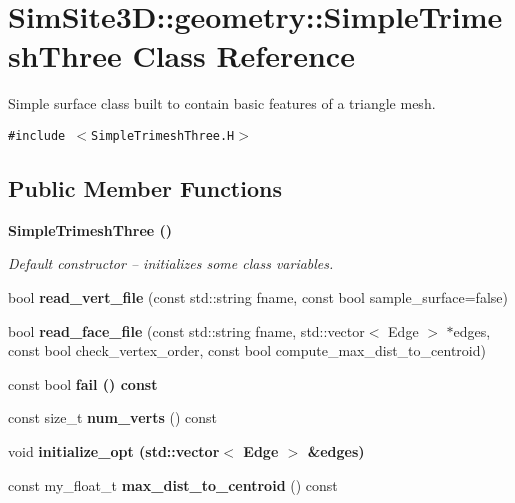 \section{SimSite3D::geometry::Simple\-Trimesh\-Three Class Reference}
\label{classSimSite3D_1_1geometry_1_1SimpleTrimeshThree}
Simple surface class built to contain basic features of a triangle mesh.  


{\tt \#include $<$Simple\-Trimesh\-Three.H$>$}

\subsection*{Public Member Functions}
\begin{CompactItemize}
\item 
\bf{Simple\-Trimesh\-Three} ()\label{classSimSite3D_1_1geometry_1_1SimpleTrimeshThree_188f1d854a84a1bc43b93ba69732ead9}

\begin{CompactList}\small\item\em Default constructor -- initializes some class variables. \item\end{CompactList}\item 
bool \textbf{read\_\-vert\_\-file} (const std::string fname, const bool sample\_\-surface=false)\label{classSimSite3D_1_1geometry_1_1SimpleTrimeshThree_c9550b4265e3c6cdcaf8cb7ef4240421}

\item 
bool \textbf{read\_\-face\_\-file} (const std::string fname, std::vector$<$ Edge $>$ $\ast$edges, const bool check\_\-vertex\_\-order, const bool compute\_\-max\_\-dist\_\-to\_\-centroid)\label{classSimSite3D_1_1geometry_1_1SimpleTrimeshThree_a2eef2ac284240c555bc43308012e375}

\item 
const bool \bf{fail} () const 
\item 
const size\_\-t \textbf{num\_\-verts} () const \label{classSimSite3D_1_1geometry_1_1SimpleTrimeshThree_7357eadf46a005993e7bb4cb1525b3e7}

\item 
void \bf{initialize\_\-opt} (std::vector$<$ Edge $>$ \&edges)
\item 
const my\_\-float\_\-t \textbf{max\_\-dist\_\-to\_\-centroid} () const \label{classSimSite3D_1_1geometry_1_1SimpleTrimeshThree_623a310518c90b27345b436082e5d5dc}


\end{CompactItemize}
